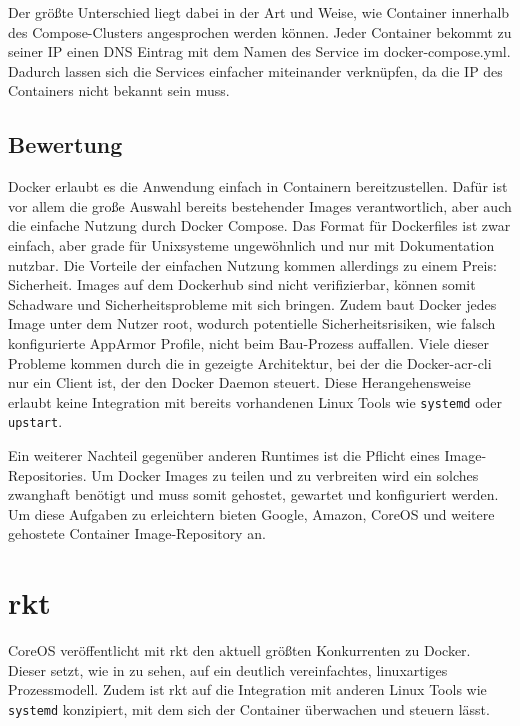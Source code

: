 Der größte Unterschied liegt dabei in der Art und Weise, wie Container innerhalb des Compose-Clusters angesprochen werden können. Jeder Container bekommt zu seiner IP einen DNS Eintrag mit dem Namen des Service im docker-compose.yml. Dadurch lassen sich die Services einfacher miteinander verknüpfen, da die IP des Containers nicht bekannt sein muss.

\subsection{Bewertung}
\label{sec:compDockerBewertung}
Docker erlaubt es die Anwendung einfach in Containern bereitzustellen. Dafür ist vor allem die große Auswahl bereits bestehender Images verantwortlich, aber auch die einfache Nutzung durch Docker Compose. Das Format für Dockerfiles ist zwar einfach, aber grade für Unixsysteme ungewöhnlich und nur mit Dokumentation nutzbar. Die Vorteile der einfachen Nutzung kommen allerdings zu einem Preis: Sicherheit. Images auf dem Dockerhub sind nicht verifizierbar, können somit Schadware und Sicherheitsprobleme mit sich bringen. Zudem baut Docker jedes Image unter dem Nutzer root, wodurch potentielle Sicherheitsrisiken, wie falsch konfigurierte AppArmor Profile, nicht beim Bau-Prozess auffallen. Viele dieser Probleme kommen durch die in  gezeigte Architektur, bei der die Docker-\gls{acr-cli} nur ein Client ist, der den Docker Daemon steuert. Diese Herangehensweise erlaubt keine Integration mit bereits vorhandenen Linux Tools wie \texttt{systemd} oder \texttt{upstart}.

Ein weiterer Nachteil gegenüber anderen Runtimes ist die Pflicht eines Image-Repositories. Um Docker Images zu teilen und zu verbreiten wird ein solches zwanghaft benötigt und muss somit gehostet, gewartet und konfiguriert werden. Um diese Aufgaben zu erleichtern bieten Google, Amazon, CoreOS und weitere gehostete Container Image-Repository an.

\section{rkt}
\label{sec:compRkt}

CoreOS veröffentlicht mit rkt den aktuell größten Konkurrenten zu Docker. Dieser setzt, wie in  zu sehen, auf ein deutlich vereinfachtes, linuxartiges Prozessmodell. Zudem ist rkt auf die Integration mit anderen Linux Tools wie \texttt{systemd} konzipiert, mit dem sich der Container überwachen und steuern lässt.

